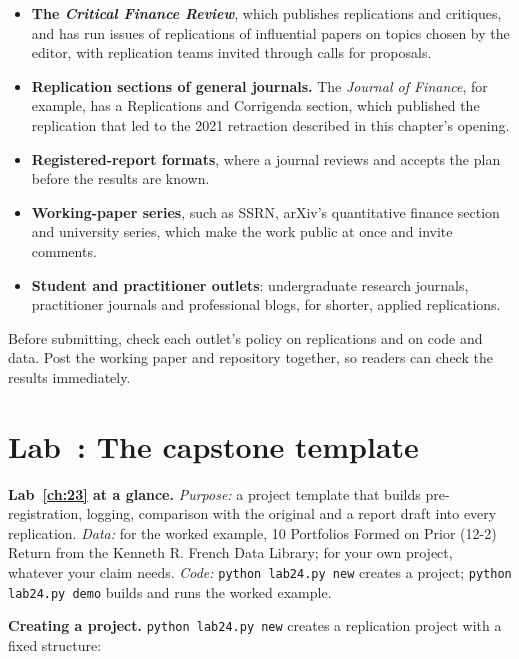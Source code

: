 \begin{itemize}
  \item \textbf{The \emph{Critical Finance Review}}, which publishes replications and critiques, and has run issues of replications of influential papers on topics chosen by the editor, with replication teams invited through calls for proposals.
  \item \textbf{Replication sections of general journals.} The \emph{Journal of Finance}, for example, has a Replications and Corrigenda section, which published the replication that led to the 2021 retraction described in this chapter's opening.
  \item \textbf{Registered-report formats}, where a journal reviews and accepts the plan before the results are known.
  \item \textbf{Working-paper series}, such as SSRN, arXiv's quantitative finance section and university series, which make the work public at once and invite comments.
  \item \textbf{Student and practitioner outlets}: undergraduate research journals, practitioner journals and professional blogs, for shorter, applied replications.
\end{itemize}

Before submitting, check each outlet's policy on replications and on code and data. Post the working paper and repository together, so readers can check the results immediately.

\section{Lab~\thechapter: The capstone template}
\label{sec:23-lab}

\begin{callout}
\textbf{Lab~\ref{ch:23} at a glance.} \emph{Purpose:} a project template that builds pre-registration, logging, comparison with the original and a report draft into every replication. \emph{Data:} for the worked example, 10 Portfolios Formed on Prior (12-2) Return from the Kenneth R. French Data Library; for your own project, whatever your claim needs. \emph{Code:} \texttt{python lab24.py new} creates a project; \texttt{python lab24.py demo} builds and runs the worked example.
\end{callout}

\textbf{Creating a project.} \texttt{python lab24.py new} creates a replication project with a fixed structure:

